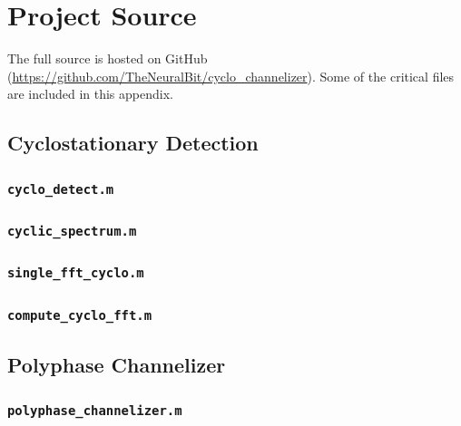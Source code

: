 \documentclass[12pt]{report}
\begin{document}

\nocite{*}


%

\appendix

\chapter{Project Source}
\label{sec:source}
The full source is hosted on GitHub
(\url{https://github.com/TheNeuralBit/cyclo\_channelizer}). Some of the
critical files are included in this appendix.

\section{Cyclostationary Detection}
\subsection{\texttt{cyclo\_detect.m}}

\subsection{\texttt{cyclic\_spectrum.m}}

\subsection{\texttt{single\_fft\_cyclo.m}}

\subsection{\texttt{compute\_cyclo\_fft.m}}


\section{Polyphase Channelizer}
\subsection{\texttt{polyphase\_channelizer.m}}

\end{document}
